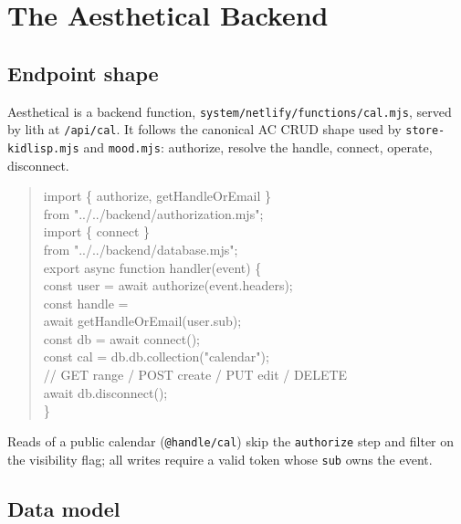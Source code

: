 \documentclass[10pt,letterpaper,twocolumn]{article}
\begin{document}
\section{The Aesthetical Backend}

\subsection{Endpoint shape}

Aesthetical is a backend function, \texttt{system/netlify/functions/cal.mjs}, served by lith at \texttt{/api/cal}. It follows the canonical AC CRUD shape used by \texttt{store-kidlisp.mjs} and \texttt{mood.mjs}: authorize, resolve the handle, connect, operate, disconnect.

\begin{quote}\small\ttfamily
import \{ authorize, getHandleOrEmail \}\\
\hspace*{1em}from "../../backend/authorization.mjs";\\
import \{ connect \}\\
\hspace*{1em}from "../../backend/database.mjs";\\[0.4em]
export async function handler(event) \{\\
\hspace*{1em}const user = await authorize(event.headers);\\
\hspace*{1em}const handle =\\
\hspace*{2em}await getHandleOrEmail(user.sub);\\
\hspace*{1em}const db = await connect();\\
\hspace*{1em}const cal = db.db.collection("calendar");\\
\hspace*{1em}// GET range / POST create / PUT edit / DELETE\\
\hspace*{1em}await db.disconnect();\\
\}
\end{quote}

Reads of a public calendar (\texttt{@handle/cal}) skip the \texttt{authorize} step and filter on the visibility flag; all writes require a valid token whose \texttt{sub} owns the event.

\subsection{Data model}
\end{document}
